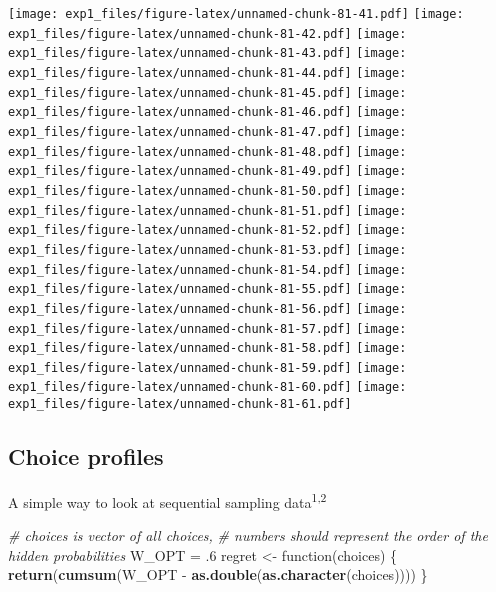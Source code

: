 \documentclass[11pt,,]{article}
\newenvironment{Shaded}{\begin{snugshade}}{\end{snugshade}}
\newcommand{\KeywordTok}[1]{\textcolor[rgb]{0.13,0.29,0.53}{\textbf{{#1}}}}
\newcommand{\DecValTok}[1]{\textcolor[rgb]{0.00,0.00,0.81}{{#1}}}
\newcommand{\StringTok}[1]{\textcolor[rgb]{0.31,0.60,0.02}{{#1}}}
\newcommand{\CommentTok}[1]{\textcolor[rgb]{0.56,0.35,0.01}{\textit{{#1}}}}
\newcommand{\NormalTok}[1]{{#1}}
\newcommand*\cleartoleftpage{%
  \clearpage
  \ifodd\value{page}\hbox{}\newpage\fi
}
\begin{document}
\texttt{[image: exp1\_files/figure-latex/unnamed-chunk-81-41.pdf]}
\texttt{[image: exp1\_files/figure-latex/unnamed-chunk-81-42.pdf]}
\texttt{[image: exp1\_files/figure-latex/unnamed-chunk-81-43.pdf]}
\texttt{[image: exp1\_files/figure-latex/unnamed-chunk-81-44.pdf]}
\texttt{[image: exp1\_files/figure-latex/unnamed-chunk-81-45.pdf]}
\texttt{[image: exp1\_files/figure-latex/unnamed-chunk-81-46.pdf]}
\texttt{[image: exp1\_files/figure-latex/unnamed-chunk-81-47.pdf]}
\texttt{[image: exp1\_files/figure-latex/unnamed-chunk-81-48.pdf]}
\texttt{[image: exp1\_files/figure-latex/unnamed-chunk-81-49.pdf]}
\texttt{[image: exp1\_files/figure-latex/unnamed-chunk-81-50.pdf]}
\texttt{[image: exp1\_files/figure-latex/unnamed-chunk-81-51.pdf]}
\texttt{[image: exp1\_files/figure-latex/unnamed-chunk-81-52.pdf]}
\texttt{[image: exp1\_files/figure-latex/unnamed-chunk-81-53.pdf]}
\texttt{[image: exp1\_files/figure-latex/unnamed-chunk-81-54.pdf]}
\texttt{[image: exp1\_files/figure-latex/unnamed-chunk-81-55.pdf]}
\texttt{[image: exp1\_files/figure-latex/unnamed-chunk-81-56.pdf]}
\texttt{[image: exp1\_files/figure-latex/unnamed-chunk-81-57.pdf]}
\texttt{[image: exp1\_files/figure-latex/unnamed-chunk-81-58.pdf]}
\texttt{[image: exp1\_files/figure-latex/unnamed-chunk-81-59.pdf]}
\texttt{[image: exp1\_files/figure-latex/unnamed-chunk-81-60.pdf]}
\texttt{[image: exp1\_files/figure-latex/unnamed-chunk-81-61.pdf]}

\cleartoleftpage

\subsection{Choice profiles}\label{choice-profiles}

A simple way to look at sequential sampling data\textsuperscript{1,2}

\begin{Shaded}
\begin{Highlighting}[]
\CommentTok{# choices is vector of all choices, }
\CommentTok{# numbers should represent the order of the hidden probabilities}
\NormalTok{W_OPT =}\StringTok{ }\NormalTok{.}\DecValTok{6}
\NormalTok{regret <-}\StringTok{ }\NormalTok{function(choices) \{ }
    \KeywordTok{return}\NormalTok{(}\KeywordTok{cumsum}\NormalTok{(W_OPT -}\StringTok{ }\KeywordTok{as.double}\NormalTok{(}\KeywordTok{as.character}\NormalTok{(choices))))}
\NormalTok{\}}
\end{Highlighting}
\end{Shaded}
\end{document}
